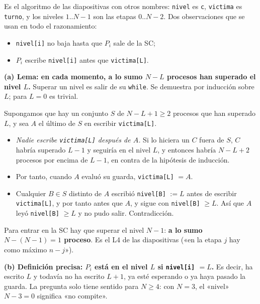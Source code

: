 \begin{solucion}
Es el algoritmo de las diapositivas con otros nombres: \texttt{nivel} es \texttt{c}, \texttt{victima} es
\texttt{turno}, y los niveles $1..N-1$ son las etapas $0..N-2$. Dos observaciones que se usan en todo el
razonamiento:
\begin{itemize}[leftmargin=*,noitemsep]
  \item \texttt{nivel[i]} no baja hasta que $P_i$ sale de la SC;
  \item $P_i$ escribe \texttt{nivel[i]} antes que \texttt{victima[L]}.
\end{itemize}

\textbf{(a) Lema: en cada momento, a lo sumo $N - L$ procesos han superado el nivel $L$.} Superar un nivel es salir
de su \texttt{while}. Se demuestra por inducción sobre $L$; para $L = 0$ es trivial.

Supongamos que hay un conjunto $S$ de $N - L + 1 \ge 2$ procesos que han superado $L$, y sea $A$ el último de $S$
en escribir \texttt{victima[L]}.
\begin{itemize}[leftmargin=*,noitemsep]
  \item \emph{Nadie escribe \texttt{victima[L]} después de $A$.} Si lo hiciera un $C$ fuera de $S$, $C$ habría
        superado $L-1$ y seguiría en el nivel $L$, y entonces habría $N-L+2$ procesos por encima de $L-1$, en
        contra de la hipótesis de inducción.
  \item Por tanto, cuando $A$ evaluó su guarda, \texttt{victima[L]} $= A$.
  \item Cualquier $B \in S$ distinto de $A$ escribió \texttt{nivel[B]} $:= L$ antes de escribir
        \texttt{victima[L]}, y por tanto antes que $A$, y sigue con \texttt{nivel[B]} $\ge L$. Así que $A$ leyó
        \texttt{nivel[B]} $\ge L$ y no pudo salir. Contradicción.
\end{itemize}
Para entrar en la SC hay que superar el nivel $N-1$: \textbf{a lo sumo $N - (N-1) = 1$ proceso}. Es el L4 de las
diapositivas («en la etapa $j$ hay como máximo $n - j$»).

\textbf{(b) Definición precisa: $P_i$ está en el nivel $L$ si \texttt{nivel[i]} $= L$.} Es decir, ha escrito $L$ y
todavía no ha escrito $L + 1$, ya esté esperando o ya haya pasado la guarda. La pregunta solo tiene sentido para
$N \ge 4$: con $N = 3$, el «nivel» $N - 3 = 0$ significa «no compite».


\end{solucion}
